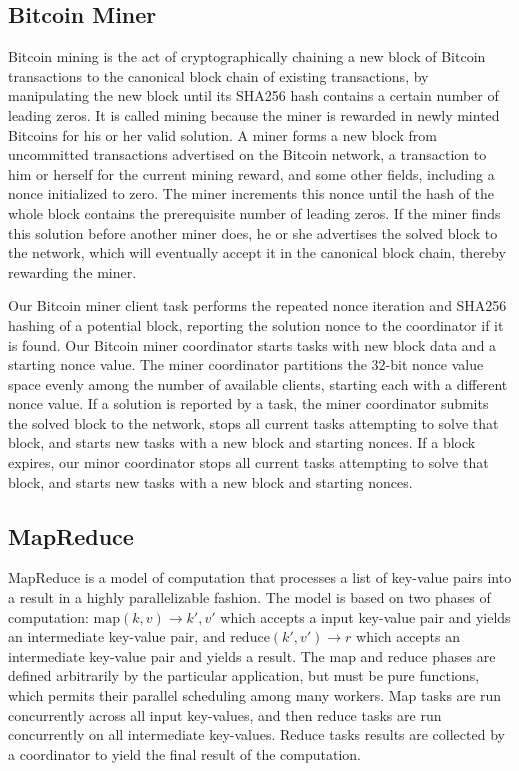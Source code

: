 \documentclass [11pt, twocolumn] {article}
\begin{document}
\subsection {Bitcoin Miner}

Bitcoin mining is the act of cryptographically chaining a new block of Bitcoin transactions to the canonical block chain of existing transactions, by manipulating the new block until its SHA256 hash contains a certain number of leading zeros. It is called mining because the miner is rewarded in newly minted Bitcoins for his or her valid solution. A miner forms a new block from uncommitted transactions advertised on the Bitcoin network, a transaction to him or herself for the current mining reward, and some other fields, including a nonce initialized to zero. The miner increments this nonce until the hash of the whole block contains the prerequisite number of leading zeros. If the miner finds this solution before another miner does, he or she advertises the solved block to the network, which will eventually accept it in the canonical block chain, thereby rewarding the miner.

Our Bitcoin miner client task performs the repeated nonce iteration and SHA256 hashing of a potential block, reporting the solution nonce to the coordinator if it is found. Our Bitcoin miner coordinator starts tasks with new block data and a starting nonce value. The miner coordinator partitions the 32-bit nonce value space evenly among the number of available clients, starting each with a different nonce value. If a solution is reported by a task, the miner coordinator submits the solved block to the network, stops all current tasks attempting to solve that block, and starts new tasks with a new block and starting nonces. If a block expires, our minor coordinator stops all current tasks attempting to solve that block, and starts new tasks with a new block and starting nonces.

\subsection {MapReduce} 

MapReduce is a model of computation that processes a list of key-value pairs into a result in a highly parallelizable fashion. The model is based on two phases of computation: $\text{map}(k, v) \rightarrow k',v'$ which accepts a input key-value pair and yields an intermediate key-value pair, and $\text{reduce}(k', v') \rightarrow r$ which accepts an intermediate key-value pair and yields a result. The map and reduce phases are defined arbitrarily by the particular application, but must be pure functions, which permits their parallel scheduling among many workers. Map tasks are run concurrently across all input key-values, and then reduce tasks are run concurrently on all intermediate key-values. Reduce tasks results are collected by a coordinator to yield the final result of the computation.
\end{document}
